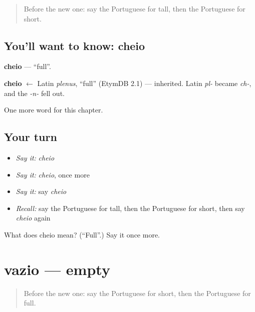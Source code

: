 \label{lesson:PT-C67-cheio}



\begin{quote}
Before the new one: say the Portuguese for tall, then the Portuguese for short.
\end{quote}

\subsection*{You'll want to know: cheio}
\textbf{cheio} — \textquotedblleft{}full\textquotedblright{}.

\begin{cousinweb}
\textbf{cheio} $\leftarrow$ Latin \emph{plenus}, \textquotedblleft{}full\textquotedblright{} (EtymDB 2.1) — inherited. Latin \emph{pl-} became \emph{ch-}, and the \emph{-n-} fell out.
\end{cousinweb}

\begin{grammarlens}[title={What you've built}]
One more word for this chapter.
\end{grammarlens}

\subsection*{Your turn}
\begin{itemize}
\raggedright
  \item \emph{Say it:} \emph{cheio}
  \item \emph{Say it:} \emph{cheio}, once more
  \item \emph{Say it:} say \emph{cheio}
  \item \emph{Recall:} say the Portuguese for tall, then the Portuguese for short, then say \emph{cheio} again
\end{itemize}

\begin{tcolorbox}[breakable,colback=teal!4,colframe=teal!35!black,title={Before you move on}]
What does cheio mean? (\textquotedblleft{}Full\textquotedblright{}.) Say it once more.
\end{tcolorbox}
\section[vazio]{vazio — empty}

\label{lesson:PT-C67-vazio}



\begin{quote}
Before the new one: say the Portuguese for short, then the Portuguese for full.
\end{quote}


